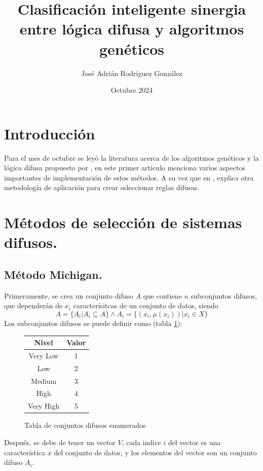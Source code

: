 \documentclass{article}
\title{Clasificación inteligente sinergia entre lógica difusa y algoritmos genéticos }
\author{José Adrián Rodríguez González}
\date{Octubre 2024}
\begin{document}
\maketitle
\section{Introducción}
Para el mes de octubre se leyó la literatura acerca de los algoritmos genéticos y la lógica difusa propuesto por \citep{article1}, en este primer articulo menciona varios aspectos importantes de implementación de estos métodos. A su vez que en \citep{413232}, explica otra metodología de aplicación para crear seleccionar reglas difusas.
\section{Métodos de selección de sistemas difusos.} 
\subsection{Método Michigan.}
Primeramente, se crea un conjunto difuso \(A\) que contiene \(n\) subconjuntos difusos, que dependerán de \(x_i\) caracterísitcas de un conjunto de datos, siendo 
\[ A=\{A_i |A_i \subseteq A\} \wedge A_i=\{(x_i,\mu(x_i))|x_i \in X\}\]
Los subconjuntos difusos se puede definir como (tabla \ref{table:Table1}):
\begin{figure}[h]
    \centering    
    \begin{tabular}{|c|c|}
        \hline
        Nivel & Valor \\ \hline
        Very Low & 1 \\
        \hline
        Low & 2 \\
        \hline
        Medium & 3 \\
        \hline
        High & 4 \\
        \hline
        Very High & 5 \\
        \hline
    \end{tabular}
    \caption{Tabla de conjuntos difusos enumerados}
    \label{table:Table1}
\end{figure}
    

Después, se debe de tener un vector \(V\), cada indice \(i\) del vector es una característica \(x\) del conjunto de datos, y los elementos del vector son un conjunto difuso \(A_i\).
\end{document}
